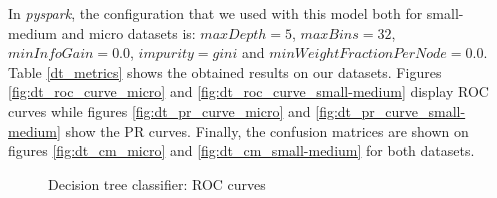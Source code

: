 \documentclass[LaM,binding=0.6cm, english]{sapthesis}
\begin{document}
In \textit{pyspark}, the configuration that we used with this model both for small-medium and micro datasets is: $maxDepth = 5$, $maxBins = 32$, $minInfoGain = 0.0$, $impurity = gini$ and $minWeightFractionPerNode = 0.0$. Table \ref{dt_metrics} shows the obtained results on our datasets. Figures \ref{fig:dt_roc_curve_micro} and \ref{fig:dt_roc_curve_small-medium} display ROC curves while figures \ref{fig:dt_pr_curve_micro} and \ref{fig:dt_pr_curve_small-medium} show the PR curves. Finally, the confusion matrices are shown on figures \ref{fig:dt_cm_micro} and \ref{fig:dt_cm_small-medium} for both datasets.
 
\begin{table}[!ht]
\centering
{}
\vspace{2mm}
\caption{Decision tree classifier metrics}
\label{dt_metrics}
\end{table}

\begin{figure}[!ht]
  \centering
  \hfill
  \caption{Decision tree classifier: ROC curves}
\end{figure}
\end{document}
